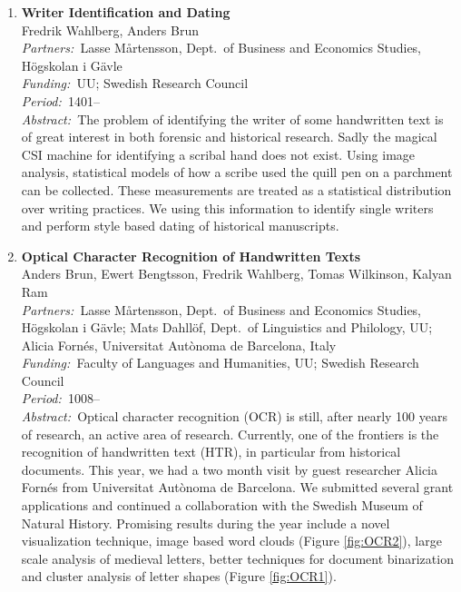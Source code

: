 \documentclass[10pt, a4paper]{article}
\newcommand{\aabstract}[1]{\emph{Abstract:~}#1}
\newcommand{\ffunding}[1]{\emph{Funding:~}#1\\}
\newcommand{\ppartners}[1]{\emph{Partners:~}#1\\}
\newcommand{\pperiod}[1]{\emph{Period:~}#1\\}
\begin{document}
{\begin{enumerate}
\subsection{Other applications}

\item \textbf{Writer Identification and Dating}\\
Fredrik Wahlberg, Anders Brun\\
\ppartners{Lasse M{\aa}rtensson, Dept.~of Business and Economics Studies, H\"{o}gskolan i G\"{a}vle}
\ffunding{UU; Swedish Research Council}
\pperiod{1401--}
\aabstract{The problem of identifying the writer of some handwritten text is of great interest in both forensic and historical research. Sadly the magical CSI machine for identifying a scribal hand does not exist. Using image analysis, statistical models of how a scribe used the quill pen on a parchment can be collected. These measurements are treated as a statistical distribution over writing practices. We using this information to identify single writers and perform style based dating of historical manuscripts.}


\item \textbf{Optical Character Recognition of Handwritten Texts}\\
Anders Brun, Ewert Bengtsson, Fredrik Wahlberg, Tomas Wilkinson, Kalyan Ram\\
\ppartners{Lasse M{\aa}rtensson, Dept.~of Business and Economics Studies, H\"{o}gskolan i G\"{a}vle; Mats Dahll\"{o}f, Dept.~of Linguistics and Philology, UU; Alicia Forn\' es, Universitat Aut\` onoma de Barcelona, Italy}
\ffunding{Faculty of Languages and Humanities, UU; Swedish Research Council}
\pperiod{1008--}
\aabstract{Optical character recognition (OCR) is still, after nearly 100 years of research, an active area of research. Currently, one of the frontiers is the recognition of handwritten text (HTR), in particular from historical documents. This year, we had a two month visit by guest researcher Alicia Forn\' es from Universitat Aut\` onoma de Barcelona. We submitted several grant applications and continued a collaboration with the Swedish Museum of Natural History. Promising results during the year include a novel visualization technique, image based word clouds (Figure \ref{fig:OCR2}), large scale analysis of medieval letters, better techniques for document binarization and cluster analysis of letter shapes (Figure \ref{fig:OCR1}).}


\end{enumerate}}
\end{document}
